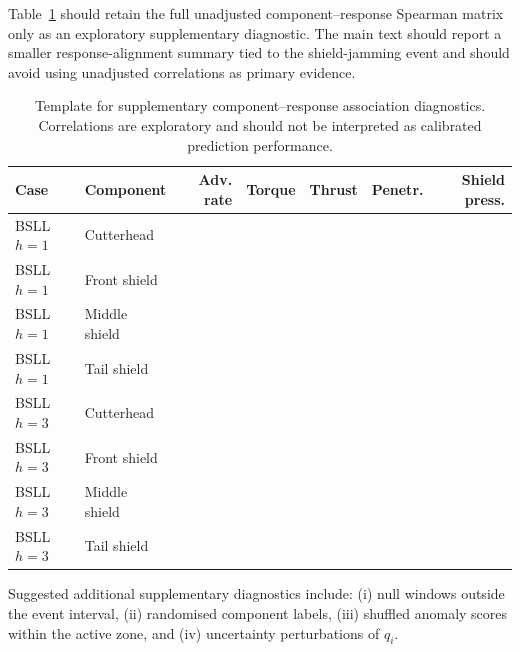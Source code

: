 Table~\ref{tab:supp_spearman} should retain the full unadjusted component--response Spearman matrix only as an exploratory supplementary diagnostic. The main text should report a smaller response-alignment summary tied to the shield-jamming event and should avoid using unadjusted correlations as primary evidence.

\begin{table}[!htbp]
\centering
\caption{Template for supplementary component--response association diagnostics. Correlations are exploratory and should not be interpreted as calibrated prediction performance.}
\label{tab:supp_spearman}
\small
\begin{tabular}{@{}llrrrrr@{}}
\toprule
Case & Component & Adv. rate & Torque & Thrust & Penetr. & Shield press. \\
\midrule
BSLL $h=1$ & Cutterhead &  &  &  &  &  \\
BSLL $h=1$ & Front shield &  &  &  &  &  \\
BSLL $h=1$ & Middle shield &  &  &  &  &  \\
BSLL $h=1$ & Tail shield &  &  &  &  &  \\
BSLL $h=3$ & Cutterhead &  &  &  &  &  \\
BSLL $h=3$ & Front shield &  &  &  &  &  \\
BSLL $h=3$ & Middle shield &  &  &  &  &  \\
BSLL $h=3$ & Tail shield &  &  &  &  &  \\
\bottomrule
\end{tabular}
\end{table}

Suggested additional supplementary diagnostics include: (i) null windows outside the event interval, (ii) randomised component labels, (iii) shuffled anomaly scores within the active zone, and (iv) uncertainty perturbations of $q_i$.
